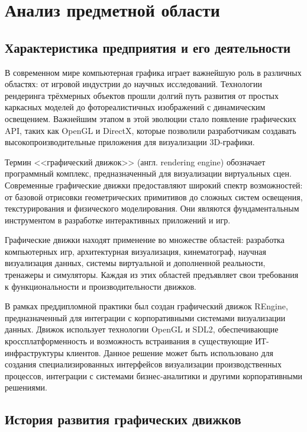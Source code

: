 \section{Анализ предметной области}
\subsection{Характеристика предприятия и его деятельности}

В современном мире компьютерная графика играет важнейшую роль в различных областях: от игровой индустрии до научных исследований. Технологии рендеринга трёхмерных объектов прошли долгий путь развития от простых каркасных моделей до фотореалистичных изображений с динамическим освещением. Важнейшим этапом в этой эволюции стало появление графических API, таких как OpenGL и DirectX, которые позволили разработчикам создавать высокопроизводительные приложения для визуализации 3D-графики.

Термин <<графический движок>> (англ. rendering engine) обозначает программный комплекс, предназначенный для визуализации виртуальных сцен. Современные графические движки предоставляют широкий спектр возможностей: от базовой отрисовки геометрических примитивов до сложных систем освещения, текстурирования и физического моделирования. Они являются фундаментальным инструментом в разработке интерактивных приложений и игр.

Графические движки находят применение во множестве областей: разработка компьютерных игр, архитектурная визуализация, кинематограф, научная визуализация данных, системы виртуальной и дополненной реальности, тренажеры и симуляторы. Каждая из этих областей предъявляет свои требования к функциональности и производительности движков.

В рамках преддипломной практики был создан графический движок REngine, предназначенный для интеграции с корпоративными системами визуализации данных. Движок использует технологии OpenGL и SDL2, обеспечивающие кроссплатформенность и возможность встраивания в существующие ИТ-инфраструктуры клиентов. Данное решение может быть использовано для создания специализированных интерфейсов визуализации производственных процессов, интеграции с системами бизнес-аналитики и другими корпоративными решениями.

\subsection{История развития графических движков}

